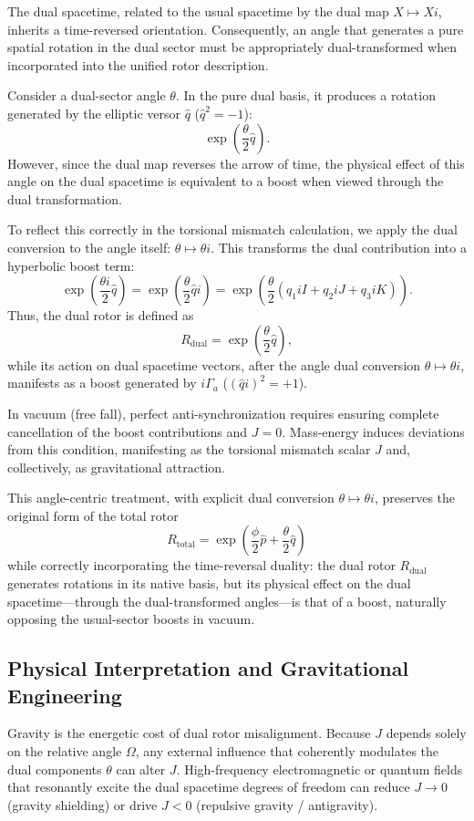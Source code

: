 \documentclass[dvipdfmx,a4paper]{article}
\begin{document}
The dual spacetime, related to the usual spacetime by the dual map $X \mapsto Xi$, inherits a time-reversed orientation. Consequently, an angle that generates a pure spatial rotation in the dual sector must be appropriately dual-transformed when incorporated into the unified rotor description.

Consider a dual-sector angle $\theta$. In the pure dual basis, it produces a rotation generated by the elliptic versor $\hat{q}$ ($\hat{q}^2 = -1$):
\[
\exp\left( \frac{\theta}{2} \hat{q} \right).
\]
However, since the dual map reverses the arrow of time, the physical effect of this angle on the dual spacetime is equivalent to a boost when viewed through the dual transformation.

To reflect this correctly in the torsional mismatch calculation, we apply the dual conversion to the angle itself: $\theta \mapsto \theta i$. This transforms the dual contribution into a hyperbolic boost term:
\[
\exp\left( \frac{\theta i}{2} \hat{q} \right) = \exp\left( \frac{\theta}{2} \hat{q}i \right) = \exp\left( \frac{\theta}{2} (q_1 iI + q_2 iJ + q_3 iK) \right).
\]
Thus, the dual rotor is defined as
\[
R_\text{dual} = \exp\left( \frac{\theta}{2} \hat{q} \right),
\]
while its action on dual spacetime vectors, after the angle dual conversion $\theta \mapsto \theta i$, manifests as a boost generated by $i\Gamma_a$ ($ (\hat{q}i)^2 = +1 $).

In vacuum (free fall), perfect anti-synchronization requires ensuring complete cancellation of the boost contributions and $J=0$. Mass-energy induces deviations from this condition, manifesting as the torsional mismatch scalar $J$ and, collectively, as gravitational attraction.

This angle-centric treatment, with explicit dual conversion $\theta \mapsto \theta i$, preserves the original form of the total rotor
\[
R_\text{total} = \exp\left( \frac{\phi}{2} \hat{p} + \frac{\theta}{2} \hat{q} \right)
\]
while correctly incorporating the time-reversal duality: the dual rotor $R_\text{dual}$ generates rotations in its native basis, but its physical effect on the dual spacetime—through the dual-transformed angles—is that of a boost, naturally opposing the usual-sector boosts in vacuum.

\subsection{Physical Interpretation and Gravitational Engineering}

Gravity is the energetic cost of dual rotor misalignment. Because $J$ depends solely on the relative angle $\Omega$, any external influence that coherently modulates the dual components $\theta$ can alter $J$. High-frequency electromagnetic or quantum fields that resonantly excite the dual spacetime degrees of freedom can reduce $J \to 0$ (gravity shielding) or drive $J < 0$ (repulsive gravity / antigravity).
\end{document}
